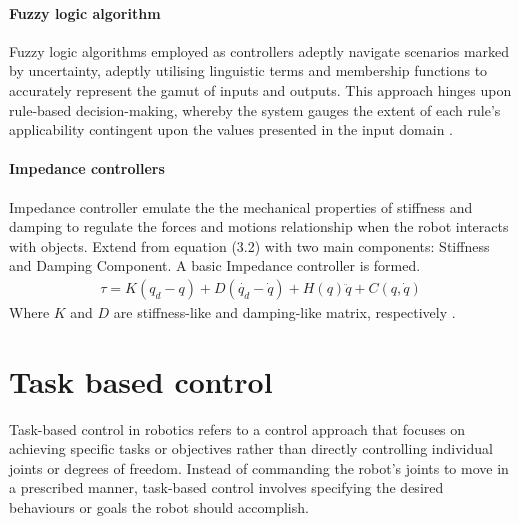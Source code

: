 \documentclass[report.tex]{subfiles}
\begin{document}
    \paragraph*{\large{Fuzzy logic algorithm}\\}
    Fuzzy logic algorithms employed as controllers adeptly navigate scenarios marked by uncertainty, adeptly utilising linguistic terms and membership functions to accurately represent the gamut of inputs and outputs. This approach hinges upon rule-based decision-making, whereby the system gauges the extent of each rule's applicability contingent upon the values presented in the input domain \cite{dadios2012fuzzy}.
    \paragraph*{\large{Impedance controllers}\\}
    Impedance controller emulate the the mechanical properties of stiffness and damping to regulate the forces and motions relationship when the robot interacts with objects. Extend from equation (3.2) with two main components: Stiffness and Damping Component. A basic Impedance controller is formed.
    \begin{align}
            \tau  = K(q_d -q) + D (\dot{q_d} - \dot{q}) + H(q)\ddot{q}+ C(q,\dot{q})
    \end{align}
    Where $K$ and $D$ are stiffness-like and damping-like matrix, respectively \cite{song2017impedance}.
    \section{Task based control}
    Task-based control in robotics refers to a control approach that focuses on achieving specific tasks or objectives rather than directly controlling individual joints or degrees of freedom. Instead of commanding the robot's joints to move in a prescribed manner, task-based control involves specifying the desired behaviours or goals the robot should accomplish.
\end{document}
